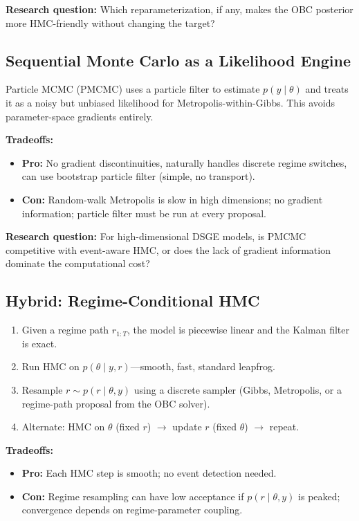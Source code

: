 \textbf{Research question:} Which reparameterization, if any, makes the OBC
posterior more HMC-friendly without changing the target?

\subsection{Sequential Monte Carlo as a Likelihood Engine}

Particle MCMC (PMCMC) uses a particle filter to estimate $p(y \mid \theta)$
and treats it as a noisy but unbiased likelihood for Metropolis-within-Gibbs.
This avoids parameter-space gradients entirely.

\textbf{Tradeoffs:}
\begin{itemize}
  \item \textbf{Pro:} No gradient discontinuities, naturally handles discrete
    regime switches, can use bootstrap particle filter (simple, no transport).
  \item \textbf{Con:} Random-walk Metropolis is slow in high dimensions; no
    gradient information; particle filter must be run at every proposal.
\end{itemize}

\textbf{Research question:} For high-dimensional DSGE models, is PMCMC
competitive with event-aware HMC, or does the lack of gradient information
dominate the computational cost?

\subsection{Hybrid: Regime-Conditional HMC}

\begin{enumerate}
  \item Given a regime path $r_{1:T}$, the model is piecewise linear and the
    Kalman filter is exact.
  \item Run HMC on $p(\theta \mid y, r)$—smooth, fast, standard leapfrog.
  \item Resample $r \sim p(r \mid \theta, y)$ using a discrete sampler
    (Gibbs, Metropolis, or a regime-path proposal from the OBC solver).
  \item Alternate: HMC on $\theta$ (fixed $r$) $\to$ update $r$ (fixed
    $\theta$) $\to$ repeat.
\end{enumerate}

\textbf{Tradeoffs:}
\begin{itemize}
  \item \textbf{Pro:} Each HMC step is smooth; no event detection needed.
  \item \textbf{Con:} Regime resampling can have low acceptance if $p(r \mid
    \theta, y)$ is peaked; convergence depends on regime-parameter coupling.
\end{itemize}

